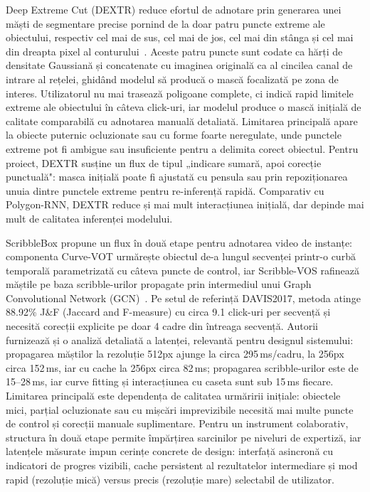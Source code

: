 Deep Extreme Cut (DEXTR) reduce efortul de adnotare prin generarea unei măști de segmentare precise pornind de la doar patru puncte extreme ale obiectului, respectiv cel mai de sus, cel mai de jos, cel mai din stânga și cel mai din dreapta pixel al conturului~\cite{maninis2018deepextremecutextreme}. Aceste patru puncte sunt codate ca hărți de densitate Gaussiană și concatenate cu imaginea originală ca al cincilea canal de intrare al rețelei, ghidând modelul să producă o mască focalizată pe zona de interes. Utilizatorul nu mai trasează poligoane complete, ci indică rapid limitele extreme ale obiectului în câteva click-uri, iar modelul produce o mască inițială de calitate comparabilă cu adnotarea manuală detaliată. Limitarea principală apare la obiecte puternic ocluzionate sau cu forme foarte neregulate, unde punctele extreme pot fi ambigue sau insuficiente pentru a delimita corect obiectul. Pentru proiect, DEXTR susține un flux de tipul „indicare sumară, apoi corecție punctuală": masca inițială poate fi ajustată cu pensula sau prin repoziționarea unuia dintre punctele extreme pentru re-inferență rapidă. Comparativ cu Polygon-RNN, DEXTR reduce și mai mult interacțiunea inițială, dar depinde mai mult de calitatea inferenței modelului.

ScribbleBox propune un flux în două etape pentru adnotarea video de instanțe: componenta Curve-VOT urmărește obiectul de-a lungul secvenței printr-o curbă temporală parametrizată cu câteva puncte de control, iar Scribble-VOS rafinează măștile pe baza scribble-urilor propagate prin intermediul unui Graph Convolutional Network (GCN)~\cite{chen2020scribbleboxinteractiveannotationframework}. Pe setul de referință DAVIS2017, metoda atinge 88.92\% J\&F (Jaccard and F-measure) cu circa 9.1 click-uri per secvență și necesită corecții explicite pe doar 4 cadre din întreaga secvență. Autorii furnizează și o analiză detaliată a latenței, relevantă pentru designul sistemului: propagarea măștilor la rezoluție 512px ajunge la circa 295\,ms/cadru, la 256px circa 152\,ms, iar cu cache la 256px circa 82\,ms; propagarea scribble-urilor este de 15--28\,ms, iar curve fitting și interacțiunea cu caseta sunt sub 15\,ms fiecare. Limitarea principală este dependența de calitatea urmăririi inițiale: obiectele mici, parțial ocluzionate sau cu mișcări imprevizibile necesită mai multe puncte de control și corecții manuale suplimentare. Pentru un instrument colaborativ, structura în două etape permite împărțirea sarcinilor pe niveluri de expertiză, iar latențele măsurate impun cerințe concrete de design: interfață asincronă cu indicatori de progres vizibili, cache persistent al rezultatelor intermediare și mod rapid (rezoluție mică) versus precis (rezoluție mare) selectabil de utilizator.

